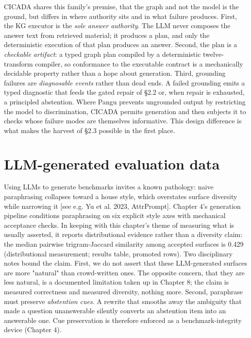 \documentclass[10pt]{article} %
\begin{document}
CICADA shares this family's premise, that the graph and not the model is the ground, but differs in where authority sits and in what failure produces. First, the KG executor is the \emph{sole answer authority}. The LLM never composes the answer text from retrieved material; it produces a plan, and only the deterministic execution of that plan produces an answer. Second, the plan is a \emph{checkable artifact}: a typed graph plan compiled by a deterministic twelve-transform compiler, so conformance to the executable contract is a mechanically decidable property rather than a hope about generation. Third, grounding failures are \emph{diagnosable events} rather than dead ends. A failed grounding emits a typed diagnostic that feeds the gated repair of \S2.2 or, when repair is exhausted, a principled abstention. Where Pangu prevents ungrounded output by restricting the model to discrimination, CICADA permits generation and then subjects it to checks whose failure modes are themselves informative. This design difference is what makes the harvest of \S2.3 possible in the first place.

\section{LLM-generated evaluation data}\label{sec:llm-generated-evaluation-data}

Using LLMs to generate benchmarks invites a known pathology: naive paraphrasing collapses toward a house style, which overstates surface diversity while narrowing it [see e.g. Yu et al. 2023, AttrPrompt]. Chapter 4's generation pipeline conditions paraphrasing on six explicit style axes with mechanical acceptance checks. In keeping with this chapter's theme of measuring what is usually asserted, it reports distributional evidence rather than a diversity claim: the median pairwise trigram-Jaccard similarity among accepted surfaces is 0.429 (distributional measurement; results table, promoted rows). Two disciplinary notes bound the claim. First, we do not assert that these LLM-generated surfaces are more "natural" than crowd-written ones. The opposite concern, that they are less natural, is a documented limitation taken up in Chapter 8; the claim is measured correctness and measured diversity, nothing more. Second, paraphrase must preserve \emph{abstention cues}. A rewrite that smooths away the ambiguity that made a question unanswerable silently converts an abstention item into an answerable one. Cue preservation is therefore enforced as a benchmark-integrity device (Chapter 4).
\end{document}
